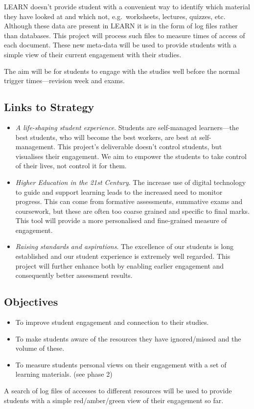\documentclass[11pt]{lucs-art}
\begin{document}
LEARN doesn’t provide student with a convenient way to identify which
material they have looked at and which not, e.g.\ worksheets,
lectures, quizzes, etc.  Although these data are present in LEARN it
is in the form of log files rather than databases.  This project will
process such files to measure times of access of each document.
These new meta-data will be used to provide students with a simple
view of their current engagement with their studies.

The aim will be for students to engage with the studies well
before the normal trigger times---revision week and exams.

\subsection{Links to Strategy}

\begin{itemize}
\item \emph{A life-shaping student experience}.  Students are
  self-managed learners---the best students, who will become the best
  workers, are best at self-management.  This project's deliverable
  doesn't control students, but visualises their engagement.  We aim
  to empower the students to take control of their lives, not control
  it for them.
\item\emph{Higher Education in the 21st Century}.  The increase use of
  digital technology to guide and support learning leads to the
  increased need to monitor progress.  This can come from formative
  assessments, summative exams and coursework, but these are often too
  coarse grained and specific to final marks.  This tool will provide
  a more personalised and fine-grained measure of engagement.
\item\emph{Raising standards and aspirations}.  The excellence of our
  students is long established and our student experience is extremely
  well regarded.  This project will further enhance both by enabling
  earlier engagement and consequently better assessment results.
\end{itemize}

\subsection{Objectives}

\begin{itemize}
\item To improve student engagement and connection to their studies.
\item To make students aware of the resources they have ignored/missed
  and the volume of these.
\item To measure students personal views on their engagement with a
  set of learning materials. (see phase 2)
\end{itemize}
A search of log files of accesses to different resources will be used
to provide students with a simple red/amber/green view of their
engagement so far.
\end{document}
